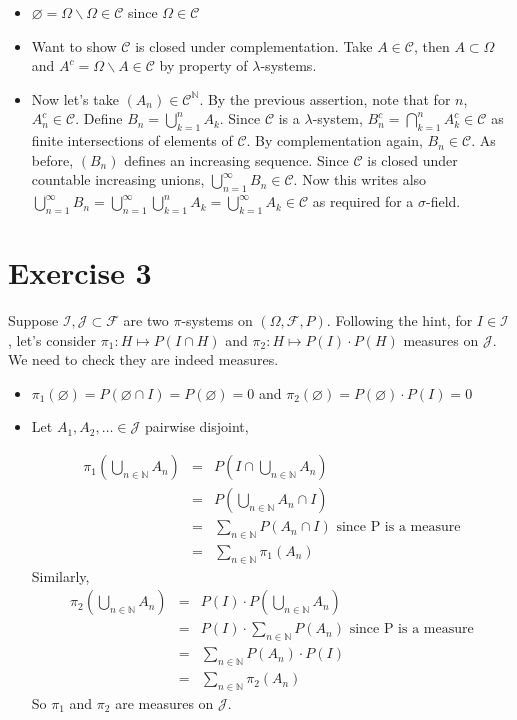 \documentclass[english]{article}
\newcommand{\N}{\mathbb{N}}
\newcommand{\F}{\mathcal{F}}
\newcommand{\J}{\mathcal{J}}
\newcommand{\Cl}{\mathcal{C}}
\begin{document}
\begin{itemize}
    \item $\varnothing = \Omega \backslash \Omega \in \Cl$ since $\Omega  \in \Cl$
    \item Want to show $\Cl$ is closed under complementation. Take $A\in \Cl$, then $A \subset \Omega$ and $A^c = \Omega \backslash A \in \Cl$ by property of $\lambda$-systems. 
    \item Now let's take $(A_n) \in \Cl^\N$. By the previous assertion, note that for $n$, $A_n^c \in \Cl$. Define $B_n = \bigcup_{k=1}^n A_k$. Since $\Cl$ is a $\lambda$-system, $B_n^c = \bigcap_{k=1}^n A_k^c \in \Cl$ as finite intersections of elements of $\Cl$. By complementation again, $B_n \in \Cl$.  As before, $(B_n)$ defines an increasing sequence. Since $\Cl$ is closed under countable increasing unions, $\bigcup_{n =1}^{\infty} B_n \in \Cl$. Now this writes also  $\bigcup_{n =1}^{\infty} B_n = \bigcup_{n =1}^{\infty} \bigcup_{k=1}^n A_k = \bigcup_{k =1}^{\infty} A_k  \in \Cl$ as required for a $\sigma$-field. 
\end{itemize}

\section*{Exercise 3}
Suppose $\mathcal{I}, \J \subset \F$ are two $\pi$-systems on $(\Omega, \F, P)$. Following the hint, for $I \in \mathcal{I}$, let's consider $\pi_1 : H \mapsto P(I \cap H)$ and $\pi_2 : H \mapsto P(I)\cdot P(H)$ measures on $\J$. 
We need to check they are indeed measures. 
\begin{itemize}
    \item $\pi_1(\varnothing) = P(\varnothing \cap I) = P(\varnothing) = 0$ and $\pi_2(\varnothing) = P(\varnothing) \cdot P( I)  = 0$ 
    \item Let $A_1,  A_2, \dots \in \J$ pairwise disjoint,  

	\begin{eqnarray*}
		\pi_1(\bigcup_{n \in \N} A_n) &  = & P(I \cap \bigcup_{n \in \N} A_n) \\
		& = & P(\bigcup_{n \in \N} A_n \cap I ) \\
	& = & \sum_{n \in \N} P(A_n \cap I) \text{ \ since P is a measure} \\
 & = & \sum_{n \in \N} \pi_1(A_n) 
	\end{eqnarray*} 
Similarly, 
	\begin{eqnarray*}
		\pi_2(\bigcup_{n \in \N} A_n) &  = & P(I) \cdot P(\bigcup_{n \in \N} A_n) \\
	& = & P(I) \cdot \sum_{n \in \N} P(A_n) \text{ \ since P is a measure} \\
& = & \sum_{n \in \N} P(A_n) \cdot P(I) \\
 & = & \sum_{n \in \N} \pi_2(A_n) 
	\end{eqnarray*} 
So $\pi_1$ and $\pi_2$ are measures on $\J$.
\end{itemize}
\end{document}
